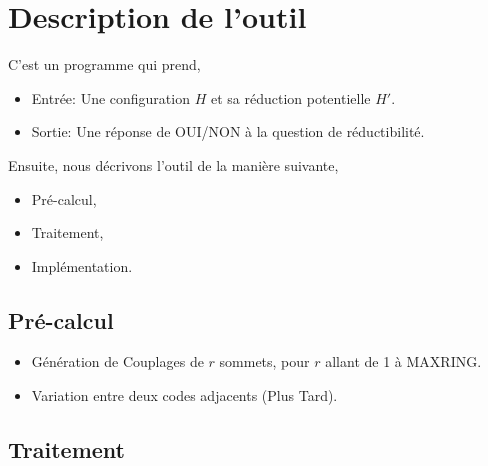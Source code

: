 \documentclass{beamer}
\begin{document}
%

\section{Description de l'outil}

\begin{frame}
C'est un programme qui prend,
\begin{itemize}
\item Entrée:  Une configuration $H$ et sa réduction potentielle $H'$.
\item Sortie:  Une réponse de OUI/NON à la question de réductibilité.
\end{itemize}
Ensuite, nous décrivons l'outil de la manière suivante,
\begin{itemize}
\item Pré-calcul,
\item Traitement,
\item Implémentation.
\end{itemize} 
\end{frame}

\subsection{Pré-calcul}
\begin{frame}
\begin{itemize}
\item Génération de Couplages de $r$ sommets, pour $r$ allant de 1 à MAXRING.
\item Variation entre deux codes adjacents (Plus Tard).
\end{itemize}
\end{frame}

\subsection{Traitement}
\end{document}
